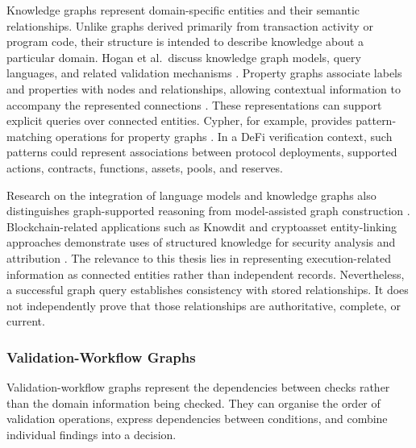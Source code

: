 Knowledge graphs represent domain-specific entities and
their semantic relationships. Unlike graphs derived
primarily from transaction activity or program code,
their structure is intended to describe knowledge about
a particular domain. Hogan et al.\ discuss knowledge
graph models, query languages, and related validation
mechanisms \cite{hoganKnowledgeGraphs2021}.
Property graphs associate labels and properties with
nodes and relationships, allowing contextual information
to accompany the represented connections
\cite{anglesPropertyGraphModel2018}. These representations can support explicit queries over
connected entities. Cypher, for example, provides
pattern-matching operations for property graphs
\cite{francisCypher2018}. In a DeFi verification context,
such patterns could represent associations between
protocol deployments, supported actions, contracts,
functions, assets, pools, and reserves.

Research on the integration of language models and
knowledge graphs also distinguishes graph-supported
reasoning from model-assisted graph construction
\cite{panUnifyingLargeLanguage2023}.
Blockchain-related applications such as Knowdit and
cryptoasset entity-linking approaches demonstrate uses
of structured knowledge for security analysis and
attribution
\cite{TODO_Knowdit,TODO_CryptoassetEntityLinking}. The relevance to this thesis lies in representing
execution-related information as connected entities
rather than independent records. Nevertheless, a
successful graph query establishes consistency with
stored relationships. It does not independently prove
that those relationships are authoritative, complete,
or current.

%

\subsubsection{Validation-Workflow Graphs}

Validation-workflow graphs represent the dependencies
between checks rather than the domain information
being checked. They can organise the order of validation
operations, express dependencies between conditions,
and combine individual findings into a decision.

